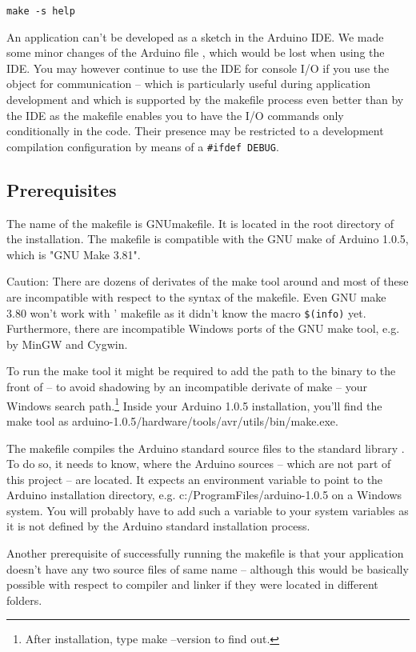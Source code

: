 \verb+make -s help+

An \rtos{} application can't be developed as a sketch in the Arduino IDE.
We made some minor changes of the Arduino file , which would
be lost when using the IDE. You may however continue to use the IDE for
console I/O if you use the object  for communication --
which is particularly useful during application development and which is
supported by the makefile process even better than by the IDE as the
makefile enables you to have the I/O commands only conditionally in the
code. Their presence may be restricted to a development compilation
configuration by means of a \verb+#ifdef DEBUG+.


\subsection{Prerequisites}
\label{secPrerequisites}

The name of the makefile is GNUmakefile. It is located in the root
directory of the \rtos{} installation. The makefile is compatible with the
GNU make of Arduino 1.0.5, which is "GNU Make 3.81".

Caution: There are dozens of derivates of the make tool around and most of
these are incompatible with respect to the syntax of the makefile. Even
GNU make 3.80 won't work with \rtos' makefile as it didn't know the macro
\verb+$(info)+ yet. Furthermore, there are incompatible Windows ports of
the GNU make tool, e.g. by MinGW and Cygwin.

To run the make tool it might be required to add the path to the binary to
the front of -- to avoid shadowing by an incompatible derivate of make --
your Windows search path.\footnote{After installation, type make --version
to find out.} Inside your Arduino 1.0.5 installation, you'll find the make
tool as
arduino-1.0.5/\-hard\-ware/\-tools/\-avr/\-utils/\-bin/\-make.exe.

The makefile compiles the Arduino standard source files to the standard
library . To do so, it needs to know, where the Arduino sources
-- which are not part of this project -- are located. It expects an
environment variable  to point to the Arduino
installation directory, e.g.
c:/ProgramFiles/\-arduino-1.0.5 on a Windows system. You will
probably have to add such a variable to your system variables as it is not
defined by the Arduino standard installation process.

Another prerequisite of successfully running the makefile is that your
application doesn't have any two source files of same name -- although
this would be basically possible with respect to compiler and linker if
they were located in different folders.

